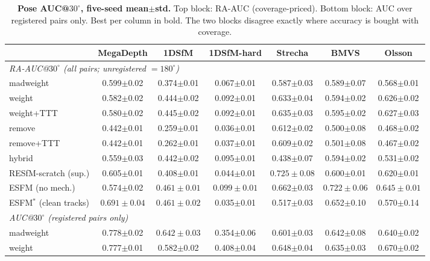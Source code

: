 \documentclass{article}
\newcommand{\mad}{madweight}
\begin{document}
\begin{table}[h]\centering\scriptsize
\setlength{\tabcolsep}{3pt}
\caption{\textbf{Pose AUC@$30^{\circ}$, five-seed mean$\pm$std.} Top block: RA-AUC
(coverage-priced). Bottom block: AUC over registered pairs only. Best per column in
bold. The two blocks disagree exactly where accuracy is bought with coverage.}
\label{tab:raauc}
\begin{tabular}{@{}lcccccc@{}}
\toprule
 & MegaDepth & 1DSfM & 1DSfM-hard & Strecha & BMVS & Olsson\\
\midrule
\multicolumn{7}{l}{\emph{RA-AUC@$30^{\circ}$ (all pairs; unregistered $=180^{\circ}$)}}\\[1pt]
\mad{}       & 0.599$\pm$0.02 & 0.374$\pm$0.01 & 0.067$\pm$0.01 & 0.587$\pm$0.03 & 0.589$\pm$0.07 & 0.568$\pm$0.01\\
weight       & 0.582$\pm$0.02 & 0.444$\pm$0.02 & 0.092$\pm$0.01 & 0.633$\pm$0.04 & 0.594$\pm$0.02 & 0.626$\pm$0.02\\
weight+TTT   & 0.580$\pm$0.02 & 0.445$\pm$0.02 & 0.092$\pm$0.01 & 0.635$\pm$0.03 & 0.595$\pm$0.02 & 0.627$\pm$0.03\\
remove       & 0.442$\pm$0.01 & 0.259$\pm$0.01 & 0.036$\pm$0.01 & 0.612$\pm$0.02 & 0.500$\pm$0.08 & 0.468$\pm$0.02\\
remove+TTT   & 0.442$\pm$0.01 & 0.262$\pm$0.01 & 0.037$\pm$0.01 & 0.609$\pm$0.02 & 0.501$\pm$0.08 & 0.467$\pm$0.02\\
hybrid       & 0.559$\pm$0.03 & 0.442$\pm$0.02 & 0.095$\pm$0.01 & 0.438$\pm$0.07 & 0.594$\pm$0.02 & 0.531$\pm$0.02\\
RESfM-scratch (sup.) & 0.605$\pm$0.01 & 0.408$\pm$0.01 & 0.044$\pm$0.01 & $\mathbf{0.725\pm0.08}$ & 0.600$\pm$0.01 & 0.620$\pm$0.01\\
ESFM (no mech.) & 0.574$\pm$0.02 & $\mathbf{0.461\pm0.01}$ & $\mathbf{0.099\pm0.01}$ & 0.662$\pm$0.03 & $\mathbf{0.722\pm0.06}$ & $\mathbf{0.645\pm0.01}$\\
ESFM$^{\ast}$ (clean tracks) & $\mathbf{0.691\pm0.04}$ & $\mathbf{0.461\pm0.02}$ & 0.035$\pm$0.01 & 0.517$\pm$0.03 & 0.652$\pm$0.10 & 0.570$\pm$0.14\\
\midrule
\multicolumn{7}{l}{\emph{AUC@$30^{\circ}$ (registered pairs only)}}\\[1pt]
\mad{}       & 0.778$\pm$0.02 & $\mathbf{0.642\pm0.03}$ & 0.354$\pm$0.06 & 0.601$\pm$0.03 & 0.642$\pm$0.08 & 0.640$\pm$0.02\\
weight       & 0.777$\pm$0.01 & 0.582$\pm$0.02 & 0.408$\pm$0.04 & 0.648$\pm$0.04 & 0.635$\pm$0.03 & 0.670$\pm$0.02\\

\end{tabular}
\end{table}
\end{document}
